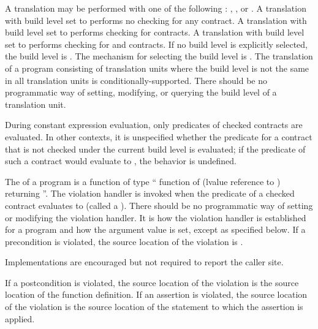 \pnum
A translation may be performed
with one of the following :
, , or .
A translation with build level set to 
performs no checking for any contract.
A translation with build level set to 
performs checking for  contracts.
A translation with build level set to 
performs checking for  and  contracts.
If no build level is explicitly selected, the build level is .
The mechanism for selecting the build level is
.
The translation of a program consisting of translation units
where the build level is not the same in all translation units
is conditionally-supported.
There should be no programmatic way of setting, modifying, or querying
the build level of a translation unit.

\pnum
During constant expression evaluation,
only predicates of checked contracts are evaluated.
In other contexts,
it is unspecified whether the predicate for a contract
that is not checked under the current build level is evaluated;
if the predicate of such a contract
would evaluate to , the behavior is undefined.

\pnum
The  of a program is a function of type
`` function of
(lvalue reference to )
returning ''.
The violation handler is invoked
when the predicate of a checked contract evaluates to 
(called a ).
There should be no programmatic way of
setting or modifying the violation handler.
It is 
how the violation handler is established for a program and
how
the  argument value
is set,
except as specified below.
If a precondition is violated, the source location of the violation is
.
\begin{note}
Implementations are encouraged but not required to report the caller site.
\end{note}
If a postcondition is violated, the source location of the violation is
the source location of the function definition.
If an assertion is violated, the source location of the violation is
the source location of the statement to which the assertion is applied.

